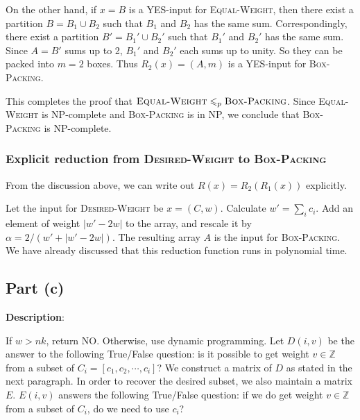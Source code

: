 \documentclass{article}
\begin{document}
On the other hand, if $x=B$ is a YES-input for \textsc{Equal-Weight}, then there exist a partition $B=B_1\cup B_2$ such that $B_1$ and $B_2$ has the same sum. Correspondingly, there exist a partition $B'=B_1'\cup B_2'$ such that $B_1'$ and $B_2'$ has the same sum. Since $A=B'$ sums up to 2, $B_1'$ and $B_2'$ each sums up to unity. So they can be packed into $m=2$ boxes. Thus $R_2(x)=(A,m)$ is a YES-input for \textsc{Box-Packing}.

This completes the proof that $\textsc{Equal-Weight}\leqslant_p\textsc{Box-Packing}$. Since \textsc{Equal-Weight} is NP-complete and \textsc{Box-Packing} is in NP, we conclude that \textsc{Box-Packing} is NP-complete.

\subsubsection{Explicit reduction from \textsc{Desired-Weight} to \textsc{Box-Packing}}
From the discussion above, we can write out $R(x)=R_2(R_1(x))$ explicitly.

Let the input for \textsc{Desired-Weight} be $x=(C,w)$. Calculate $w'=\sum_ic_i$. Add an element of weight $|w'-2w|$ to the array, and rescale it by $\alpha=2/(w'+|w'-2w|)$. The resulting array $A$ is the input for \textsc{Box-Packing}. We have already discussed that this reduction function runs in polynomial time.

\subsection{Part (c)}
\noindent\textbf{Description}:

If $w>nk$, return NO. Otherwise, use dynamic programming. Let $D(i,v)$ be the answer to the following True/False question: is it possible to get weight $v\in\mathbb{Z}$ from a subset of $C_i=[c_1,c_2,\cdots,c_i]$? We construct a matrix of $D$ as stated in the next paragraph. In order to recover the desired subset, we also maintain a matrix $E$. $E(i,v)$ answers the following True/False question: if we do get weight $v\in\mathbb{Z}$ from a subset of $C_i$, do we need to use $c_i$?
\end{document}
